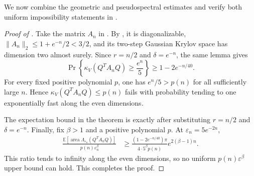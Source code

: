 \documentclass[11pt]{article}
\begin{document}
We now combine the geometric and pseudospectral estimates and verify both
uniform impossibility statements in .

\begin{proof}[Proof of ]
Take the matrix $A_n$ in .  By
, it is diagonalizable,
$\lVert A_n\rVert_2\leq1+e^{-n}/2<3/2$, and its two-step Gaussian Krylov space has
dimension two almost surely.  Since $r=n/2$ and $\delta=e^{-n}$, the same
lemma gives
\[
  \Pr\!\left\{\kappa_V(Q^TA_nQ)\geq\frac{e^n}{5}\right\}
  \geq1-2e^{-n/40}.
\]
For every fixed positive polynomial $p$, one has $e^n/5>p(n)$ for all sufficiently
large $n$.  Hence $\kappa_V(Q^TA_nQ)\leq p(n)$ fails with probability tending
to one exponentially fast along the even dimensions.

The expectation bound in the theorem is exactly
 after substituting $r=n/2$ and
$\delta=e^{-n}$.  Finally, fix $\beta>1$ and a positive polynomial $p$.  At
$\varepsilon_n=5e^{-2n}$,
\begin{align*}
  \frac{\mathbb E[\operatorname{area}
  \Lambda_{\varepsilon_n}(Q^TA_nQ)]}
  {p(n)\varepsilon_n^\beta}
  &\geq
  \frac{(1-2e^{-n/40})\pi}
  {4\cdot5^\beta p(n)}e^{2(\beta-1)n}.
\end{align*}
This ratio tends to infinity along the even dimensions, so no uniform
$p(n)\varepsilon^\beta$ upper bound can hold.  This completes the proof.
\end{proof}



\end{document}
